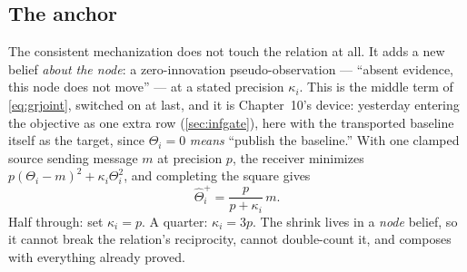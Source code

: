 \subsection{The anchor}

The consistent mechanization does not touch the relation at all.  It
adds a new belief \emph{about the node}: a zero-innovation
pseudo-observation --- ``absent evidence, this node does not move'' ---
at a stated precision $\kappa_i$.  This is the middle term of
\cref{eq:grjoint}, switched on at last, and it is Chapter~10's
device: yesterday entering the objective as one extra row
(\cref{sec:infgate}), here with the transported baseline itself as
the target, since $\Theta_i=0$ \emph{means} ``publish the baseline.''
With one clamped source sending message $m$ at precision $p$, the
receiver minimizes $p(\Theta_i-m)^{2}+\kappa_i\Theta_i^{2}$, and
completing the square gives
\[
\hat\Theta^{+}_i=\frac{p}{p+\kappa_i}\,m .
\]
Half through: set $\kappa_i=p$.  A quarter: $\kappa_i=3p$.  The
shrink lives in a \emph{node} belief, so it cannot break the
relation's reciprocity, cannot double-count it, and composes with
everything already proved.

